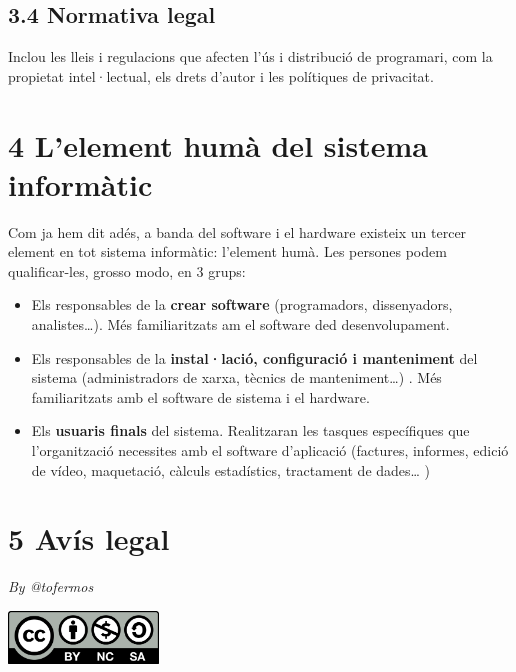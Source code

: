 \documentclass[
  12 pt,
  a4paper,
]{article}
\begin{document}
\subsection{3.4 Normativa legal}\label{normativa-legal}

Inclou les lleis i regulacions que afecten l'ús i distribució de
programari, com la propietat intel·lectual, els drets d'autor i les
polítiques de privacitat.

\section{4 L'element humà del sistema
informàtic}\label{lelement-humuxe0-del-sistema-informuxe0tic}

Com ja hem dit adés, a banda del software i el hardware existeix un
tercer element en tot sistema informàtic: l'element humà. Les persones
podem qualificar-les, grosso modo, en 3 grups:

\begin{itemize}
\item
  Els responsables de la \textbf{crear software} (programadors,
  dissenyadors, analistes\ldots). Més familiaritzats am el software ded
  desenvolupament.
\item
  Els responsables de la \textbf{instal·lació, configuració i
  manteniment} del sistema (administradors de xarxa, tècnics de
  manteniment\ldots) . Més familiaritzats amb el software de sistema i
  el hardware.
\item
  Els \textbf{usuaris finals} del sistema. Realitzaran les tasques
  específiques que l'organització necessites amb el software d'aplicació
  (factures, informes, edició de vídeo, maquetació, càlculs estadístics,
  tractament de dades\ldots{} )
\end{itemize}

\section{5 Avís legal}\label{avuxeds-legal}

\emph{By @tofermos}

\includegraphics[width=0.3\textwidth,height=\textheight]{../recursos/cc-by-nc-sa.png}
\end{document}
